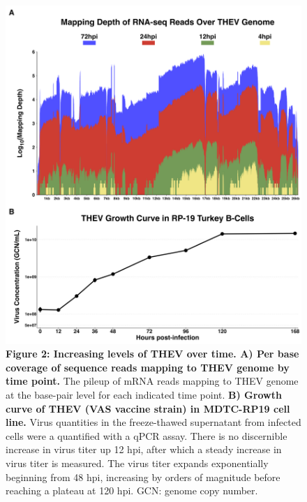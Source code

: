 \documentclass[
]{article}
\begin{document}
\begin{figure}
\centering
\includegraphics{results/r/figures/fig_2.png}
\caption{\textbf{Figure 2: Increasing levels of THEV over time. A) Per
base coverage of sequence reads mapping to THEV genome by time point.}
The pileup of mRNA reads mapping to THEV genome at the base-pair level
for each indicated time point. \textbf{B) Growth curve of THEV (VAS
vaccine strain) in MDTC-RP19 cell line.} Virus quantities in the
freeze-thawed supernatant from infected cells were a quantified with a
qPCR assay. There is no discernible increase in virus titer up 12 hpi,
after which a steady increase in virus titer is measured. The virus
titer expands exponentially beginning from 48 hpi, increasing by orders
of magnitude before reaching a plateau at 120 hpi. GCN: genome copy
number.}
\end{figure}
\end{document}
